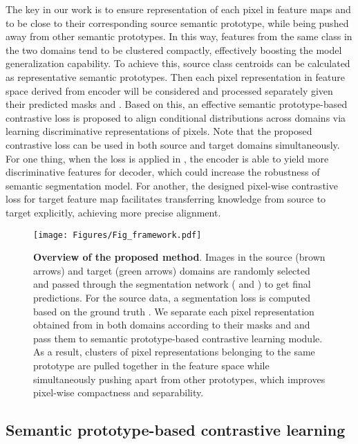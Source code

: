 \documentclass[runningheads]{llncs}
\begin{document}
The key in our work is to ensure representation of each pixel in feature maps  and  to be close to their corresponding source semantic prototype, while being pushed away from other semantic prototypes. In this way, features from the same class in the two domains tend to be clustered compactly, effectively boosting the model generalization capability. 
To achieve this, source class centroids can be calculated as representative semantic prototypes. Then each pixel representation in feature space derived from encoder  will be considered and processed separately given their predicted masks  and . Based on this, an effective semantic prototype-based contrastive loss is proposed to align conditional distributions across domains via learning discriminative representations of pixels. Note that the proposed contrastive loss can be used in both source and target domains simultaneously. For one thing, when the loss is applied in , the encoder is able to yield more discriminative features for decoder, which could increase the robustness of semantic segmentation model. For another, the designed pixel-wise contrastive loss for target feature map  facilitates transferring knowledge from source to target explicitly, achieving more precise alignment.


\begin{figure*}[t]
    \centering
    \texttt{[image: Figures/Fig\_framework.pdf]}\caption{{\bf Overview of the proposed method}. Images in the source (\textcolor[RGB]{197, 90, 17}{brown} arrows) and target (\textcolor[RGB]{84, 193, 53}{green} arrows) domains are randomly selected and passed through the segmentation network ( and ) to get final predictions. For the source data, a segmentation loss  is computed based on the ground truth . We separate each pixel representation obtained from  in both domains according to their masks  and  and pass them to semantic prototype-based contrastive learning module. As a result, clusters of pixel representations belonging to the same prototype are pulled together in the feature space while simultaneously pushing apart from other prototypes, which improves pixel-wise compactness and separability.}
\label{Fig_framework}
\end{figure*}
\subsection{Semantic prototype-based contrastive learning}
\end{document}

